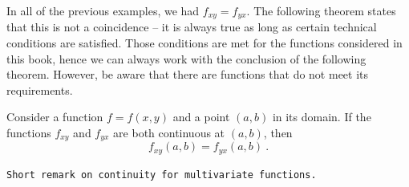 \begin{remark}
In all of the previous examples, we had $f_{xy}=f_{yx}$. The following theorem states that this is not a coincidence -- it is always true as long as certain technical conditions are satisfied. Those conditions are met for the functions considered in this book, hence we can always work with the conclusion of the following theorem. However, be aware that there are functions that do not meet its requirements.
\end{remark}

\begin{theorem}
\label{thm:schwarz}
Consider a function $f=f(x,y)$ and a point $(a,b)$ in its domain. If the functions $f_{xy}$ and
$f_{yx}$ are both continuous at $(a,b)$, then
\[f_{xy}(a,b)=f_{yx}(a,b) \:. \]
\end{theorem}

\begin{remark}
\texttt{Short remark on continuity for multivariate functions.}
\end{remark}

